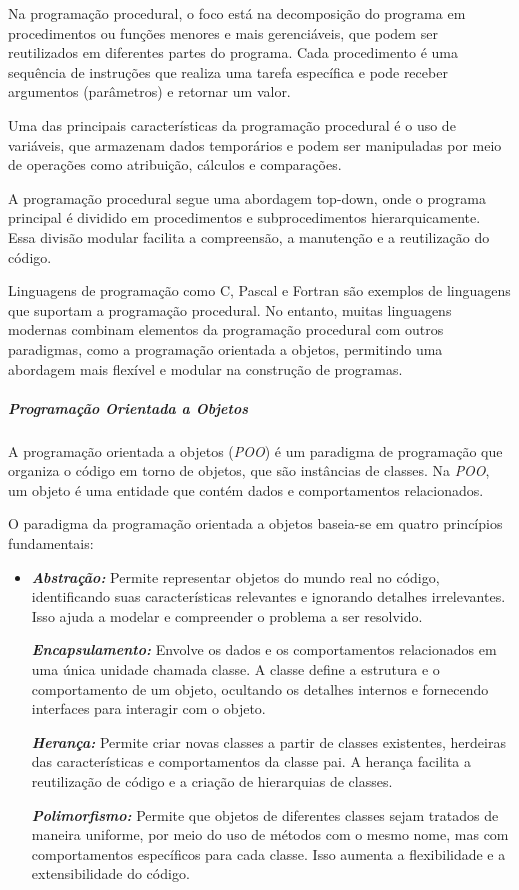 \documentclass[a4paper, 12pt, onecolumn,singlespacing]{article}
\begin{document}
	Na programação procedural, o foco está na decomposição do programa em procedimentos ou funções menores e mais gerenciáveis, que podem ser reutilizados em diferentes partes do programa. Cada procedimento é uma sequência de instruções que realiza uma tarefa específica e pode receber argumentos (parâmetros) e retornar um valor.
	
	Uma das principais características da programação procedural é o uso de variáveis, que armazenam dados temporários e podem ser manipuladas por meio de operações como atribuição, cálculos e comparações.
	
	A programação procedural segue uma abordagem top-down, onde o programa principal é dividido em procedimentos e subprocedimentos hierarquicamente. Essa divisão modular facilita a compreensão, a manutenção e a reutilização do código.
	
	Linguagens de programação como C, Pascal e Fortran são exemplos de linguagens que suportam a programação procedural. No entanto, muitas linguagens modernas combinam elementos da programação procedural com outros paradigmas, como a programação orientada a objetos, permitindo uma abordagem mais flexível e modular na construção de programas.
	
	\subparagraph{Programação Orientada a Objetos}
	\label{programacao_orientada_a_objetos}
	
	A programação orientada a objetos (\textit{POO}) é um paradigma de programação que organiza o código em torno de objetos, que são instâncias de classes. Na \textit{POO}, um objeto é uma entidade que contém dados e comportamentos relacionados.
	
	O paradigma da programação orientada a objetos baseia-se em quatro princípios fundamentais:
	\begin{itemize}
		\item 	\textbf{\textit{Abstração:}} Permite representar objetos do mundo real no código, identificando suas características relevantes e ignorando detalhes irrelevantes. Isso ajuda a modelar e compreender o problema a ser resolvido.
		
		\textbf{\textit{Encapsulamento:}} Envolve os dados e os comportamentos relacionados em uma única unidade chamada classe. A classe define a estrutura e o comportamento de um objeto, ocultando os detalhes internos e fornecendo interfaces para interagir com o objeto.
		
		\textbf{\textit{Herança:}} Permite criar novas classes a partir de classes existentes, herdeiras das características e comportamentos da classe pai. A herança facilita a reutilização de código e a criação de hierarquias de classes.
		
		\textbf{\textit{Polimorfismo:}} Permite que objetos de diferentes classes sejam tratados de maneira uniforme, por meio do uso de métodos com o mesmo nome, mas com comportamentos específicos para cada classe. Isso aumenta a flexibilidade e a extensibilidade do código.
		
	\end{itemize}
	
\end{document}
